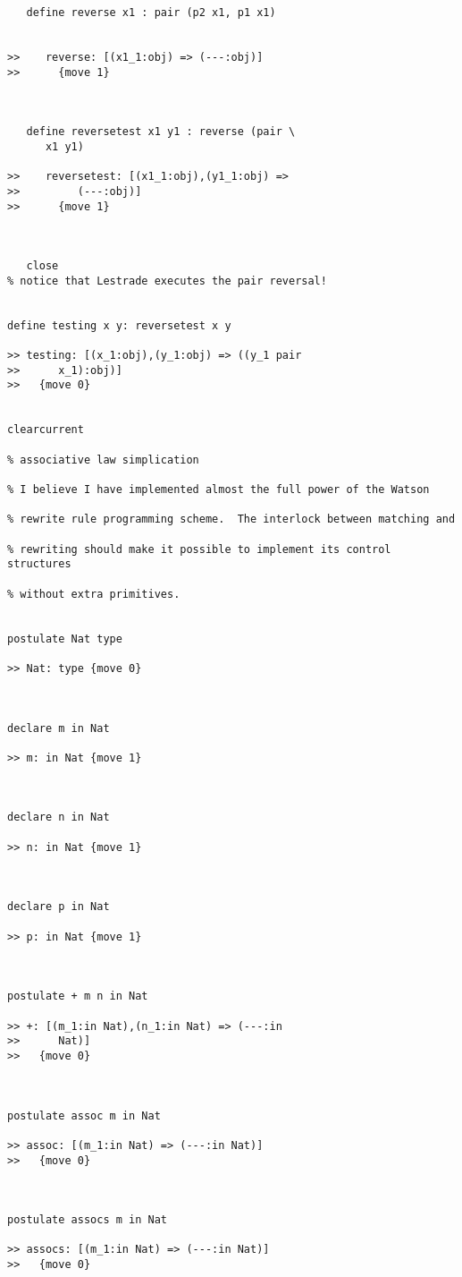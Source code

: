 \documentclass[12pt]{article}
\begin{document}
\begin{verbatim}
   define reverse x1 : pair (p2 x1, p1 x1)


>>    reverse: [(x1_1:obj) => (---:obj)]
>>      {move 1}



   define reversetest x1 y1 : reverse (pair \
      x1 y1)

>>    reversetest: [(x1_1:obj),(y1_1:obj) =>
>>         (---:obj)]
>>      {move 1}



   close
% notice that Lestrade executes the pair reversal!


define testing x y: reversetest x y

>> testing: [(x_1:obj),(y_1:obj) => ((y_1 pair
>>      x_1):obj)]
>>   {move 0}


clearcurrent

% associative law simplication

% I believe I have implemented almost the full power of the Watson

% rewrite rule programming scheme.  The interlock between matching and

% rewriting should make it possible to implement its control structures

% without extra primitives.


postulate Nat type

>> Nat: type {move 0}



declare m in Nat

>> m: in Nat {move 1}



declare n in Nat

>> n: in Nat {move 1}



declare p in Nat

>> p: in Nat {move 1}



postulate + m n in Nat

>> +: [(m_1:in Nat),(n_1:in Nat) => (---:in
>>      Nat)]
>>   {move 0}



postulate assoc m in Nat

>> assoc: [(m_1:in Nat) => (---:in Nat)]
>>   {move 0}



postulate assocs m in Nat

>> assocs: [(m_1:in Nat) => (---:in Nat)]
>>   {move 0}




\end{verbatim}
\end{document}
